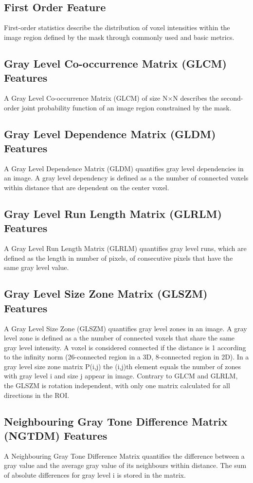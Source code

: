 \documentclass[12pt]{article}
\begin{document}
	\subsection{First Order Feature}
First-order statistics describe the distribution of voxel intensities within the image region defined by the mask through commonly used and basic metrics.

	\subsection{Gray Level Co-occurrence Matrix (GLCM) Features}
A Gray Level Co-occurrence Matrix (GLCM) of size N×N describes the second-order joint probability function of an image region constrained by the mask.

	\subsection{Gray Level Dependence Matrix (GLDM) Features}
A Gray Level Dependence Matrix (GLDM) quantifies gray level dependencies in an image. A gray level dependency is defined as a the number of connected voxels within distance that are dependent on the center voxel. 

	\subsection{Gray Level Run Length Matrix (GLRLM) Features}
A Gray Level Run Length Matrix (GLRLM) quantifies gray level runs, which are defined as the length in number of pixels, of consecutive pixels that have the same gray level value.

	\subsection{Gray Level Size Zone Matrix (GLSZM) Features}
A Gray Level Size Zone (GLSZM) quantifies gray level zones in an image. A gray level zone is defined as a the number of connected voxels that share the same gray level intensity. A voxel is considered connected if the distance is 1 according to the infinity norm (26-connected region in a 3D, 8-connected region in 2D). In a gray level size zone matrix P(i,j) the (i,j)th element equals the number of zones with gray level i and size j appear in image. Contrary to GLCM and GLRLM, the GLSZM is rotation independent, with only one matrix calculated for all directions in the ROI.

	\subsection{Neighbouring Gray Tone Difference Matrix (NGTDM) Features}
A Neighbouring Gray Tone Difference Matrix quantifies the difference between a gray value and the average gray value of its neighbours within distance. The sum of absolute differences for gray level i is stored in the matrix. 
\end{document}
